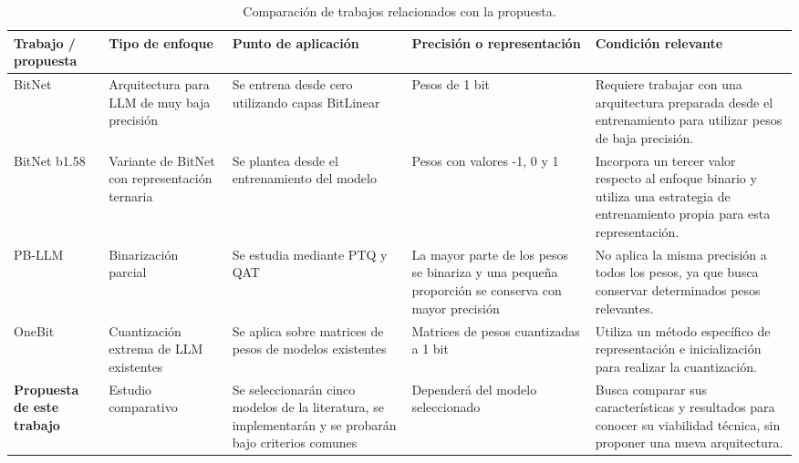 \begin{table}[H]
  \centering
  \caption{Comparación de trabajos relacionados con la propuesta.}
  \label{tab:comparativa_antecedentes}
  \begin{tabular}{@{}p{2.2cm}p{2.3cm}p{2.5cm}p{2.7cm}p{3.2cm}@{}}
    \toprule
    \textbf{Trabajo / propuesta} &
    \textbf{Tipo de enfoque} &
    \textbf{Punto de aplicación} &
    \textbf{Precisión o representación} &
    \textbf{Condición relevante} \\
    \midrule

    BitNet \cite{bitnet2023} &
    Arquitectura para LLM de muy baja precisión &
    Se entrena desde cero utilizando capas BitLinear &
    Pesos de 1 bit &
    Requiere trabajar con una arquitectura preparada desde el entrenamiento para utilizar pesos de baja precisión. \\

    BitNet b1.58 \cite{bitnet1582024} &
    Variante de BitNet con representación ternaria &
    Se plantea desde el entrenamiento del modelo &
    Pesos con valores -1, 0 y 1 &
    Incorpora un tercer valor respecto al enfoque binario y utiliza una estrategia de entrenamiento propia para esta representación. \\

    PB-LLM \cite{pbllm2024} &
    Binarización parcial &
    Se estudia mediante PTQ y QAT &
    La mayor parte de los pesos se binariza y una pequeña proporción se conserva con mayor precisión &
    No aplica la misma precisión a todos los pesos, ya que busca conservar determinados pesos relevantes. \\

    OneBit \cite{onebit2024} &
    Cuantización extrema de LLM existentes &
    Se aplica sobre matrices de pesos de modelos existentes &
    Matrices de pesos cuantizadas a 1 bit &
    Utiliza un método específico de representación e inicialización para realizar la cuantización. \\

    \textbf{Propuesta de este trabajo} &
    Estudio comparativo &
    Se seleccionarán cinco modelos de la literatura, se implementarán y se probarán bajo criterios comunes &
    Dependerá del modelo seleccionado &
    Busca comparar sus características y resultados para conocer su viabilidad técnica, sin proponer una nueva arquitectura. \\

    \bottomrule
  \end{tabular}
\end{table}

